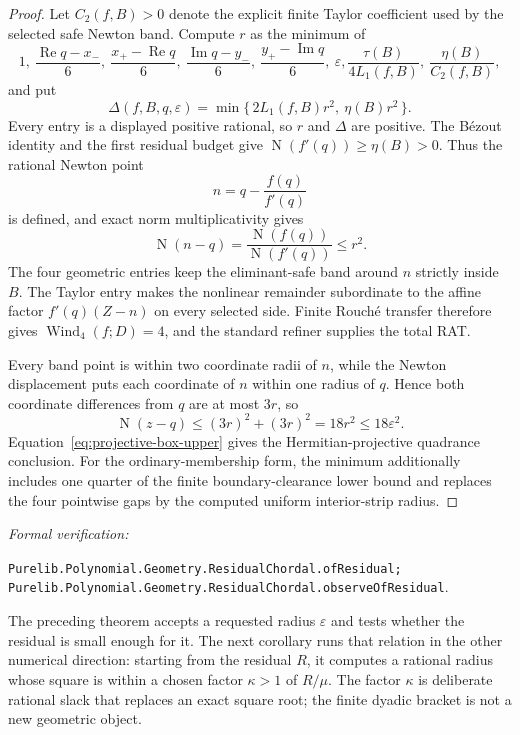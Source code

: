\documentclass[11pt]{article}
\newcommand{\Norm}[1]{\operatorname{N}\!\left(#1\right)}
\newcommand{\Ree}{\operatorname{Re}}
\newcommand{\Imm}{\operatorname{Im}}
\newcommand{\Wind}{\operatorname{Wind}}
\newcommand{\eps}{\varepsilon}
\newcommand{\leanref}[1]{\par\smallskip\noindent
  \emph{Formal verification:}\par\nobreak
  {\raggedright\nolinkurl{#1}.\par}}
\begin{document}
\begin{proof}
Let $C_2(f,B)>0$ denote the explicit finite Taylor coefficient used by the
selected safe Newton band.  Compute $r$ as the minimum of
\[
 1,\ \frac{\Ree q-x_-}{6},\ \frac{x_+-\Ree q}{6},\
 \frac{\Imm q-y_-}{6},\ \frac{y_+-\Imm q}{6},\ \eps,
 \frac{\tau(B)}{4L_1(f,B)},\ \frac{\eta(B)}{C_2(f,B)},
\]
and put
\begin{equation}
\label{eq:residual-projective-target}
 \Delta(f,B,q,\eps)=
 \min\{\,2L_1(f,B)r^2,\ \eta(B) r^2\,\}.
\end{equation}
Every entry is a displayed positive rational, so $r$ and $\Delta$ are
positive.  The Bézout identity and the first residual budget give
$\Norm{f'(q)}\ge\eta(B)>0$.  Thus the rational Newton point
\[
                        n=q-\frac{f(q)}{f'(q)}
\]
is defined, and exact norm multiplicativity gives
\[
             \Norm{n-q}=\frac{\Norm{f(q)}}{\Norm{f'(q)}}\le r^2.
\]
The four geometric entries keep the eliminant-safe band around $n$ strictly
inside $B$.  The Taylor entry makes the nonlinear remainder subordinate to
the affine factor $f'(q)(Z-n)$ on every selected side.  Finite Rouché transfer
therefore gives $\Wind_4(f;D)=4$, and the standard refiner supplies the total
RAT.

Every band point is within two coordinate radii of $n$, while the Newton
displacement puts each coordinate of $n$ within one radius of $q$.  Hence
both coordinate differences from $q$ are at most $3r$, so
\[
             \Norm{z-q}\le(3r)^2+(3r)^2=18r^2\le18\eps^2.
\]
Equation~\eqref{eq:projective-box-upper} gives the Hermitian-projective
quadrance conclusion.  For the
ordinary-membership form, the minimum additionally includes one quarter of
the finite boundary-clearance lower bound and replaces the four pointwise
gaps by the computed uniform interior-strip radius.
\end{proof}

\leanref{Purelib.Polynomial.Geometry.ResidualChordal.ofResidual;
Purelib.Polynomial.Geometry.ResidualChordal.observeOfResidual}

The preceding theorem accepts a requested radius $\eps$ and tests whether the
residual is small enough for it.  The next corollary runs that relation in the
other numerical direction: starting from the residual $R$, it computes a
rational radius whose square is within a chosen factor $\kappa>1$ of
$R/\mu$.  The factor $\kappa$ is deliberate rational slack that replaces an
exact square root; the finite dyadic bracket is not a new geometric object.
\end{document}
